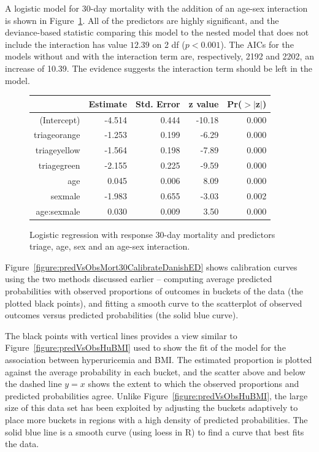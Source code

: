 A logistic model for 30-day mortality with the addition of an age-sex interaction is shown in Figure~\ref{figure:triageAgeSexInteractionMort30logreg}.  All of the predictors are highly significant, and the deviance-based statistic comparing this model to the nested model that does not include the interaction has value $12.39$ on 2 df ($p < 0.001$).  The AICs for the models without and with the interaction term are, respectively, 2192 and 2202, an increase of 10.39.  The evidence suggests the interaction term should be left in the model.

\begin{figure}[ht]
\centering
\begin{tabular}{rrrrr}
  \hline
 & Estimate & Std. Error & z value & Pr($>$$|$z$|$) \\
  \hline
(Intercept) & -4.514 & 0.444 & -10.18 & 0.000 \\
  triageorange & -1.253 & 0.199 & -6.29 & 0.000 \\
  triageyellow & -1.564 & 0.198 & -7.89 & 0.000 \\
  triagegreen & -2.155 & 0.225 & -9.59 & 0.000 \\
  age & 0.045 & 0.006 & 8.09 & 0.000 \\
  sexmale & -1.983 & 0.655 & -3.03 & 0.002 \\
  age:sexmale & 0.030 & 0.009 & 3.50 & 0.000 \\
   \hline
\end{tabular}
\caption{Logistic regression with response 30-day mortality and
       predictors triage, age, sex and an age-sex interaction.}
\label{figure:triageAgeSexInteractionMort30logreg}
\end{figure}

Figure~\ref{figure:predVsObsMort30CalibrateDanishED} shows calibration curves using the two methods discussed earlier -- computing average predicted probabilities with observed proportions of outcomes in buckets of the data (the plotted black points), and fitting a smooth curve to the scatterplot of observed outcomes versus predicted probabilities (the solid blue curve). 

The black points with vertical lines provides a view similar to Figure~\ref{figure:predVsObsHuBMI} used to show the fit of the model for the association between hyperuricemia and BMI\@. The estimated proportion is plotted against the average probability in each bucket, and the scatter above and below the dashed line $y = x$ shows the extent to which the observed proportions and predicted probabilities agree.   Unlike Figure~\ref{figure:predVsObsHuBMI},  the large size of this data set has been exploited by adjusting the buckets adaptively to place more buckets in regions with a high density of predicted probabilities. The solid blue line is a smooth curve (using loess in \textsf{R}) to find a curve that best fits the data.

